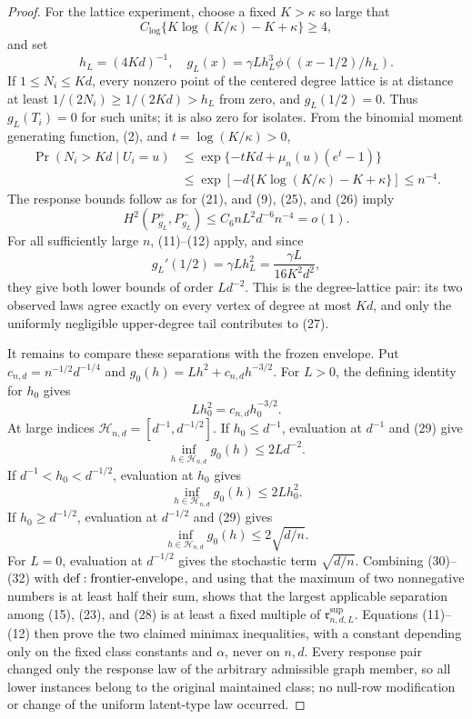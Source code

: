 \documentclass{article}
\begin{document}
\begin{proof}
For the lattice experiment, choose a fixed \(K>\kappa\) so large that
\[
 C_{\log}\{K\log(K/\kappa)-K+\kappa\}\geq4,
\tag{24}
\]
and set
\[
 h_L=(4Kd)^{-1},\quad
 g_L(x)=\gamma Lh_L^3\phi((x-1/2)/h_L).
\tag{25}
\]
If \(1\leq N_i\leq Kd\), every nonzero point of the centered degree lattice is at distance at least \(1/(2N_i)\geq1/(2Kd)>h_L\) from zero, and \(g_L(1/2)=0\).  Thus \(g_L(T_i)=0\) for such units; it is also zero for isolates.  From the binomial moment generating function, (2), and \(t=\log(K/\kappa)>0\),
\[
\begin{aligned}
 \Pr(N_i>Kd\mid U_i=u)
 &\leq\exp\{-tKd+\mu_n(u)(e^t-1)\}\\
 &\leq\exp[-d\{K\log(K/\kappa)-K+\kappa\}]
 \leq n^{-4}.
\end{aligned}
\tag{26}
\]
The response bounds follow as for (21), and (9), (25), and (26) imply
\[
 H^2(P_{g_L}^+,P_{g_L}^-)
 \leq C_6nL^2d^{-6}n^{-4}=o(1).
\tag{27}
\]
For all sufficiently large \(n\), (11)--(12) apply, and since
\[
 g_L'(1/2)=\gamma Lh_L^2=\frac{\gamma L}{16K^2d^2},
\tag{28}
\]
they give both lower bounds of order \(Ld^{-2}\).  This is the degree-lattice pair: its two observed laws agree exactly on every vertex of degree at most \(Kd\), and only the uniformly negligible upper-degree tail contributes to (27).

It remains to compare these separations with the frozen envelope.  Put \(c_{n,d}=n^{-1/2}d^{-1/4}\) and \(g_0(h)=Lh^2+c_{n,d}h^{-3/2}\).  For \(L>0\), the defining identity for \(h_0\) gives
\[
 Lh_0^2=c_{n,d}h_0^{-3/2}.
\tag{29}
\]
At large indices \(\mathcal H_{n,d}=[d^{-1},d^{-1/2}]\).  If \(h_0\leq d^{-1}\), evaluation at \(d^{-1}\) and (29) give
\[
 \inf_{h\in\mathcal H_{n,d}}g_0(h)\leq2Ld^{-2}.
\tag{30}
\]
If \(d^{-1}<h_0<d^{-1/2}\), evaluation at \(h_0\) gives
\[
 \inf_{h\in\mathcal H_{n,d}}g_0(h)\leq2Lh_0^2.
\tag{31}
\]
If \(h_0\geq d^{-1/2}\), evaluation at \(d^{-1/2}\) and (29) gives
\[
 \inf_{h\in\mathcal H_{n,d}}g_0(h)\leq2\sqrt{d/n}.
\tag{32}
\]
For \(L=0\), evaluation at \(d^{-1/2}\) gives the stochastic term \(\sqrt{d/n}\).  Combining (30)--(32) with \({\rm def:frontier\text{-}envelope}\), and using that the maximum of two nonnegative numbers is at least half their sum, shows that the largest applicable separation among (15), (23), and (28) is at least a fixed multiple of \(\mathfrak r^{\mathrm{sup}}_{n,d,L}\).  Equations (11)--(12) then prove the two claimed minimax inequalities, with a constant depending only on the fixed class constants and \(\alpha\), never on \(n,d\).  Every response pair changed only the response law of the arbitrary admissible graph member, so all lower instances belong to the original maintained class; no null-row modification or change of the uniform latent-type law occurred.
\end{proof}
\end{document}
